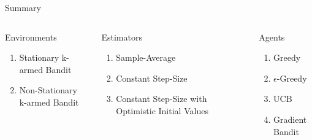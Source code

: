 \begin{frame}{Summary}

    \begin{columns}[T]

    \begin{column}{0.33\textwidth}
    \begin{block}{Environments}
    \begin{enumerate}[leftmargin=*]
        \item<1,3-5> Stationary k-armed Bandit
        \item<2> Non-Stationary\\ k-armed Bandit
    \end{enumerate}
    \end{block}
    \end{column}

    \begin{column}{0.33\textwidth}
    \begin{block}{Estimators}
    \begin{enumerate}[leftmargin=*]
        \item<1,4-5> Sample-Average
        \item<2> Constant Step-Size
        \item<3> Constant Step-Size with Optimistic Initial Values
    \end{enumerate}
    \end{block}
    \end{column}

    \begin{column}{0.33\textwidth}
    \begin{block}{Agents}
    \begin{enumerate}[leftmargin=*]
        \item<1-3> Greedy
        \item<1-3> $\epsilon$-Greedy
        \item<4> UCB
        \item<5> Gradient Bandit
    \end{enumerate}
    \end{block}
    \end{column}


\end{columns}

\end{frame}
